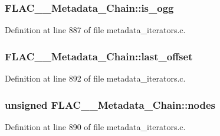 \subsubsection[{\texorpdfstring{is\+\_\+ogg}{is_ogg}}]{ F\+L\+A\+C\+\_\+\+\_\+\+Metadata\+\_\+\+Chain\+::is\+\_\+ogg}\hypertarget{struct_f_l_a_c_____metadata___chain_a2534234284b7937fe2d0fc2a9d5f10be}{}\label{struct_f_l_a_c_____metadata___chain_a2534234284b7937fe2d0fc2a9d5f10be}


Definition at line 887 of file metadata\+\_\+iterators.\+c.

\subsubsection[{\texorpdfstring{last\+\_\+offset}{last_offset}}]{ F\+L\+A\+C\+\_\+\+\_\+\+Metadata\+\_\+\+Chain\+::last\+\_\+offset}\hypertarget{struct_f_l_a_c_____metadata___chain_ab8a6f0aad4feba119e868b6267824db0}{}\label{struct_f_l_a_c_____metadata___chain_ab8a6f0aad4feba119e868b6267824db0}


Definition at line 892 of file metadata\+\_\+iterators.\+c.

\subsubsection[{\texorpdfstring{nodes}{nodes}}]{\setlength{\rightskip}{0pt plus 5cm}unsigned F\+L\+A\+C\+\_\+\+\_\+\+Metadata\+\_\+\+Chain\+::nodes}\hypertarget{struct_f_l_a_c_____metadata___chain_a9597bc065d2eb1fc9de84c856282b130}{}\label{struct_f_l_a_c_____metadata___chain_a9597bc065d2eb1fc9de84c856282b130}


Definition at line 890 of file metadata\+\_\+iterators.\+c.

